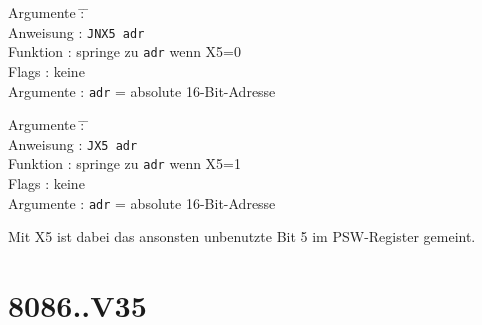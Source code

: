\documentclass[12pt,a4paper,twoside]{report}
\newcommand{\tty}[1]{{\tt #1}}
\begin{document}
{\begin{tabbing}
Argumente         \= : \= \kill \\
Anweisung         \> : \> \tty{JNX5 adr} \\
Funktion          \> : \> springe zu {\tt adr} wenn X5=0 \\
Flags             \> : \> keine \\
Argumente         \> : \> {\tt adr} = absolute 16-Bit-Adresse \\
\end{tabbing}

\begin{tabbing}
Argumente         \= : \= \kill \\
Anweisung         \> : \> \tty{JX5 adr} \\
Funktion          \> : \> springe zu {\tt adr} wenn X5=1 \\
Flags             \> : \> keine \\
Argumente         \> : \> {\tt adr} = absolute 16-Bit-Adresse \\
\end{tabbing}

Mit X5 ist dabei das ansonsten unbenutzte Bit 5 im PSW-Register gemeint.


\section{8086..V35}

}
\end{document}
